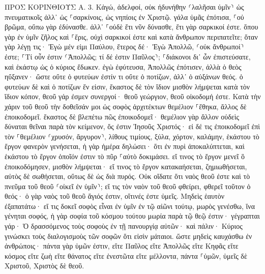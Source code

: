 \documentclass[twoside, 9pt]{extreport}
\begin{document}
ΠΡΟΣ ΚΟΡΙΝΘΙΟΥΣ Α.
3.
Κἀγώ, ἀδελφοί, οὐκ ἠδυνήθην ⸂λαλῆσαι ὑμῖν⸃ ὡς πνευματικοῖς ἀλλ᾽ ὡς ⸀σαρκίνοις, ὡς νηπίοις ἐν Χριστῷ. 
γάλα ὑμᾶς ἐπότισα, ⸀οὐ βρῶμα, οὔπω γὰρ ἐδύνασθε. ἀλλ᾽ ⸀οὐδὲ ἔτι νῦν δύνασθε, 
ἔτι γὰρ σαρκικοί ἐστε. ὅπου γὰρ ἐν ὑμῖν ζῆλος καὶ ⸀ἔρις, οὐχὶ σαρκικοί ἐστε καὶ κατὰ ἄνθρωπον περιπατεῖτε; 
ὅταν γὰρ λέγῃ τις· Ἐγὼ μέν εἰμι Παύλου, ἕτερος δέ· Ἐγὼ Ἀπολλῶ, ⸂οὐκ ἄνθρωποί⸃ ἐστε; 
⸀Τί οὖν ἐστιν ⸂Ἀπολλῶς; τί δέ ἐστιν Παῦλος⸃; ⸀διάκονοι δι᾽ ὧν ἐπιστεύσατε, καὶ ἑκάστῳ ὡς ὁ κύριος ἔδωκεν. 
ἐγὼ ἐφύτευσα, Ἀπολλῶς ἐπότισεν, ἀλλὰ ὁ θεὸς ηὔξανεν· 
ὥστε οὔτε ὁ φυτεύων ἐστίν τι οὔτε ὁ ποτίζων, ἀλλ᾽ ὁ αὐξάνων θεός. 
ὁ φυτεύων δὲ καὶ ὁ ποτίζων ἕν εἰσιν, ἕκαστος δὲ τὸν ἴδιον μισθὸν λήμψεται κατὰ τὸν ἴδιον κόπον, 
θεοῦ γάρ ἐσμεν συνεργοί· θεοῦ γεώργιον, θεοῦ οἰκοδομή ἐστε. 
Κατὰ τὴν χάριν τοῦ θεοῦ τὴν δοθεῖσάν μοι ὡς σοφὸς ἀρχιτέκτων θεμέλιον ⸀ἔθηκα, ἄλλος δὲ ἐποικοδομεῖ. ἕκαστος δὲ βλεπέτω πῶς ἐποικοδομεῖ· 
θεμέλιον γὰρ ἄλλον οὐδεὶς δύναται θεῖναι παρὰ τὸν κείμενον, ὅς ἐστιν Ἰησοῦς Χριστός· 
εἰ δέ τις ἐποικοδομεῖ ἐπὶ τὸν ⸀θεμέλιον ⸂χρυσόν, ἄργυρον⸃, λίθους τιμίους, ξύλα, χόρτον, καλάμην, 
ἑκάστου τὸ ἔργον φανερὸν γενήσεται, ἡ γὰρ ἡμέρα δηλώσει· ὅτι ἐν πυρὶ ἀποκαλύπτεται, καὶ ἑκάστου τὸ ἔργον ὁποῖόν ἐστιν τὸ πῦρ ⸀αὐτὸ δοκιμάσει. 
εἴ τινος τὸ ἔργον μενεῖ ὃ ἐποικοδόμησεν, μισθὸν λήμψεται· 
εἴ τινος τὸ ἔργον κατακαήσεται, ζημιωθήσεται, αὐτὸς δὲ σωθήσεται, οὕτως δὲ ὡς διὰ πυρός. 
Οὐκ οἴδατε ὅτι ναὸς θεοῦ ἐστε καὶ τὸ πνεῦμα τοῦ θεοῦ ⸂οἰκεῖ ἐν ὑμῖν⸃; 
εἴ τις τὸν ναὸν τοῦ θεοῦ φθείρει, φθερεῖ τοῦτον ὁ θεός· ὁ γὰρ ναὸς τοῦ θεοῦ ἅγιός ἐστιν, οἵτινές ἐστε ὑμεῖς. 
Μηδεὶς ἑαυτὸν ἐξαπατάτω· εἴ τις δοκεῖ σοφὸς εἶναι ἐν ὑμῖν ἐν τῷ αἰῶνι τούτῳ, μωρὸς γενέσθω, ἵνα γένηται σοφός, 
ἡ γὰρ σοφία τοῦ κόσμου τούτου μωρία παρὰ τῷ θεῷ ἐστιν· γέγραπται γάρ· Ὁ δρασσόμενος τοὺς σοφοὺς ἐν τῇ πανουργίᾳ αὐτῶν· 
καὶ πάλιν· Κύριος γινώσκει τοὺς διαλογισμοὺς τῶν σοφῶν ὅτι εἰσὶν μάταιοι. 
ὥστε μηδεὶς καυχάσθω ἐν ἀνθρώποις· πάντα γὰρ ὑμῶν ἐστιν, 
εἴτε Παῦλος εἴτε Ἀπολλῶς εἴτε Κηφᾶς εἴτε κόσμος εἴτε ζωὴ εἴτε θάνατος εἴτε ἐνεστῶτα εἴτε μέλλοντα, πάντα ⸀ὑμῶν, 
ὑμεῖς δὲ Χριστοῦ, Χριστὸς δὲ θεοῦ. 
\end{document}
